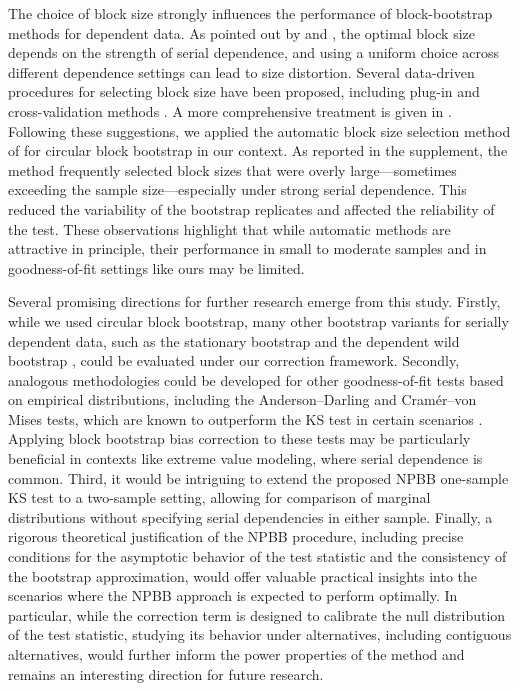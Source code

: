 \documentclass[12pt]{article}
\begin{document}
The choice of block size strongly influences the performance of
block-bootstrap methods for dependent data.
As pointed out by \citet{hall1995blocking} and
\citet{lahiri1999theoretical}, the optimal block size depends on the
strength of serial dependence, and using a uniform choice across
different dependence settings can lead to size distortion. Several
data-driven procedures for selecting block size have been proposed,
including plug-in and cross-validation methods
\citep{buhlmann2002bootstraps, politis2004automatic}. A more
comprehensive treatment is given in
\citet{lahiri2013resampling}. Following these suggestions, we applied
the automatic block size selection method of
\citet{politis2004automatic} for circular block bootstrap in our
context. As reported in the supplement, the method frequently selected
block sizes that were overly large—sometimes exceeding the sample
size—especially under strong serial dependence. This reduced the
variability of the bootstrap replicates and affected the reliability
of the test. These observations highlight that while automatic methods
are attractive in principle, their performance in small to moderate
samples and in goodness-of-fit settings like ours may be limited.


Several promising directions for further research emerge from
this study. Firstly, while we used circular block bootstrap, many
other bootstrap variants for serially dependent data, such as the
stationary bootstrap \citep{politis1994stationary} and the dependent wild
bootstrap \citep{shao2010dependent}, could be evaluated under our
correction framework. Secondly, analogous methodologies could be
developed for other goodness-of-fit tests based on empirical
distributions, including the Anderson--Darling and Cramér--von
Mises tests, which are known to outperform the KS test in certain scenarios
\citep{stephens2017tests}. Applying block bootstrap bias correction to
these tests may be particularly beneficial in contexts like extreme
value modeling, where serial dependence is common. Third, it would be
intriguing to extend the proposed NPBB
one-sample KS test to a two-sample setting, allowing for comparison of
marginal distributions without specifying serial dependencies in
either sample. Finally, a rigorous theoretical justification of the
NPBB procedure, including precise conditions for the asymptotic
behavior of the test statistic and the consistency of the bootstrap
approximation, would offer valuable practical insights into the
scenarios where the NPBB approach is expected to perform optimally.
In particular, while the
correction term is designed to calibrate the null distribution of the
test statistic, studying its behavior under alternatives, including
contiguous alternatives, would further inform the power properties of
the method and remains an interesting direction for future research.
\end{document}
